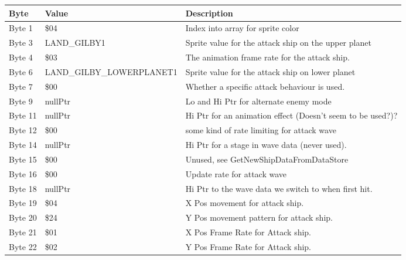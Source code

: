 \begin{figure}[H]
{\begin{adjustbox}{width=12cm}
\begin{tabular}{lll}
\toprule
 Byte    & Value                     & Description                                                        \\
\midrule
 Byte 1  & \$04                       & Index into array for sprite color                                  \\
 Byte 3  & LAND\_GILBY1               & Sprite value for the attack ship on the upper planet               \\
 Byte 4  & \$03                       & The animation frame rate for the attack ship.                      \\
 Byte 6  & LAND\_GILBY\_LOWERPLANET1   & Sprite value for the attack ship on lower planet                   \\
 Byte 7  & \$00                       & Whether a specific attack behaviour is used.                       \\
 Byte 9  & nullPtr                   & Lo and Hi Ptr for alternate enemy mode                             \\
 Byte 11 & nullPtr                   & Hi Ptr for an animation effect (Doesn't seem to be used?)?         \\
 Byte 12 & \$00                       & some kind of rate limiting for attack wave                         \\
 Byte 14 & nullPtr                   & Hi Ptr for a stage in wave data (never used).                      \\
 Byte 15 & \$00                       & Unused, see GetNewShipDataFromDataStore                            \\
 Byte 16 & \$00                       & Update rate for attack wave                                        \\
 Byte 18 & nullPtr                   & Hi Ptr to the wave data we switch to when first hit.               \\
 Byte 19 & \$04                       & X Pos movement for attack ship.                                    \\
 Byte 20 & \$24                       & Y Pos movement pattern for attack ship.                            \\
 Byte 21 & \$01                       & X Pos Frame Rate for Attack ship.                                  \\
 Byte 22 & \$02                       & Y Pos Frame Rate for Attack ship.                                  \\

\end{tabular}
\end{adjustbox}}
\end{figure}
